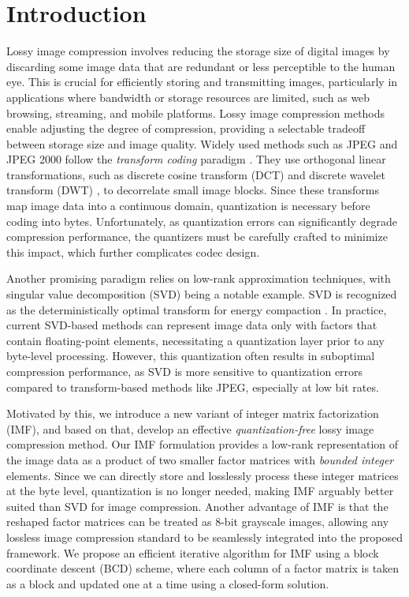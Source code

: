 \section{Introduction} \label{sec:introduction}

Lossy image compression involves reducing the storage size of digital images by discarding some image data that are redundant or less perceptible to the human eye. This is crucial for efficiently storing and transmitting images, particularly in applications where bandwidth or storage resources are limited, such as web browsing, streaming, and mobile platforms. Lossy image compression methods enable adjusting the degree of compression, providing a selectable tradeoff between storage size and image quality. Widely used methods such as JPEG \cite{wallace1991jpeg} and JPEG 2000 \cite{skodras2001jpeg} follow the \emph{transform coding} paradigm \cite{goyal2001theoretical}. They use orthogonal linear transformations, such as discrete cosine transform (DCT) \cite{ahmed1974discrete} and discrete wavelet transform (DWT) \cite{antonini1992image}, to decorrelate small image blocks. Since these transforms map image data into a continuous domain, quantization is necessary before coding into bytes. Unfortunately, as quantization errors can significantly degrade compression performance, the quantizers must be carefully crafted to minimize this impact, which further complicates codec design.

Another promising paradigm relies on low-rank approximation techniques, with singular value decomposition (SVD) being a notable example. SVD is recognized as the deterministically optimal transform for energy compaction \cite{andrews1976singular}. In practice, current SVD-based methods \cite{andrews1976singular, prasantha2007image, hou2015sparse} can represent image data only with factors that contain floating-point elements, necessitating a quantization layer prior to any byte-level processing. However, this quantization often results in suboptimal compression performance, as SVD is more sensitive to quantization errors compared to transform-based methods like JPEG, especially at low bit rates.

Motivated by this, we introduce a new variant of integer matrix factorization (IMF), and based on that, develop an effective \emph{quantization-free} lossy image compression method. Our IMF formulation provides a low-rank representation of the image data as a product of two smaller factor matrices with \emph{bounded integer} elements. Since we can directly store and losslessly process these integer matrices at the byte level, quantization is no longer needed, making IMF arguably better suited than SVD for image compression. Another advantage of IMF is that the reshaped factor matrices can be treated as 8-bit grayscale images, allowing any lossless image compression standard to be seamlessly integrated into the proposed framework. We propose an efficient iterative algorithm for IMF using a block coordinate descent (BCD) scheme, where each column of a factor matrix is taken as a block and updated one at a time using a closed-form solution.

